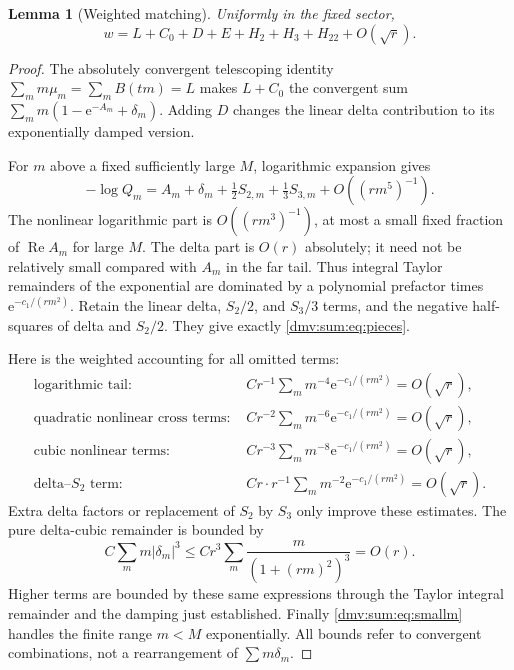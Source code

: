 \documentclass[11pt,letterpaper]{article}
\numberwithin{equation}{section}
\newtheorem{lemma}[theorem]{Lemma}
\theoremstyle{definition}\newtheorem{definition}[theorem]{Definition}
\theoremstyle{remark}\newtheorem{remark}[theorem]{Remark}
\newcommand{\ee}{\mathrm e}
\DeclareMathOperator{\Rea}{Re}
\begin{document}
\begin{lemma}[Weighted matching]\label{dmv:sum:lem:matching}
Uniformly in the fixed sector,
\begin{equation}\label{dmv:sum:eq:matched}
 w=L+C_0+D+E+H_2+H_3+H_{22}+O(\sqrt r).
\end{equation}
\end{lemma}
\begin{proof}
The absolutely convergent telescoping identity $\sum_m m\mu_m=\sum_m B(tm)=L$ makes $L+C_0$ the convergent sum $\sum_m m(1-\ee^{-A_m}+\delta_m)$. Adding $D$ changes the linear delta contribution to its exponentially damped version.

For $m$ above a fixed sufficiently large $M$, logarithmic expansion gives
\[
 -\log Q_m=A_m+\delta_m+\tfrac12S_{2,m}+\tfrac13S_{3,m}
                  +O((rm^5)^{-1}).
\]
The nonlinear logarithmic part is $O((rm^3)^{-1})$, at most a small fixed fraction of $\Rea A_m$ for large $M$. The delta part is $O(r)$ absolutely; it need not be relatively small compared with $A_m$ in the far tail. Thus integral Taylor remainders of the exponential are dominated by a polynomial prefactor times $\ee^{-c_1/(rm^2)}$. Retain the linear delta, $S_2/2$, and $S_3/3$ terms, and the negative half-squares of delta and $S_2/2$. They give exactly \eqref{dmv:sum:eq:pieces}.

Here is the weighted accounting for all omitted terms:
\begin{align*}
 \text{logarithmic tail: }&
 Cr^{-1}\sum_m m^{-4}\ee^{-c_1/(rm^2)}=O(\sqrt r),\\
 \text{quadratic nonlinear cross terms: }&
 Cr^{-2}\sum_m m^{-6}\ee^{-c_1/(rm^2)}=O(\sqrt r),\\
 \text{cubic nonlinear terms: }&
 Cr^{-3}\sum_m m^{-8}\ee^{-c_1/(rm^2)}=O(\sqrt r),\\
 \text{delta--}S_2\text{ term: }&
 Cr\cdot r^{-1}\sum_m m^{-2}\ee^{-c_1/(rm^2)}=O(\sqrt r).
\end{align*}
Extra delta factors or replacement of $S_2$ by $S_3$ only improve these estimates. The pure delta-cubic remainder is bounded by
\[
 C\sum_m m|\delta_m|^3\le Cr^3\sum_m\frac{m}{(1+(rm)^2)^3}=O(r).
\]
Higher terms are bounded by these same expressions through the Taylor integral remainder and the damping just established. Finally \eqref{dmv:sum:eq:smallm} handles the finite range $m<M$ exponentially. All bounds refer to convergent combinations, not a rearrangement of $\sum m\delta_m$.
\end{proof}
\end{document}
